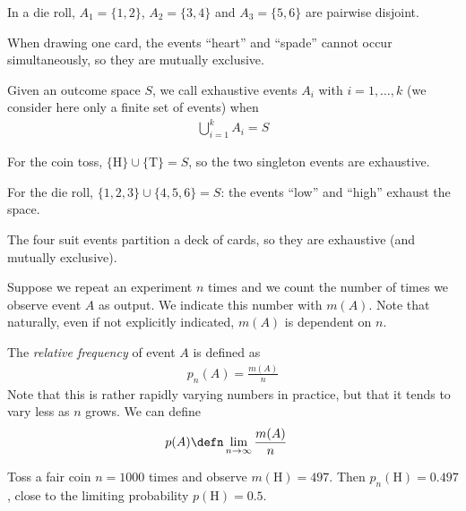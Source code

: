 \documentclass[a4paper, 12pt]{book}
\begin{document}
\begin{example}
    In a die roll, $A_1=\{1,2\}$, $A_2=\{3,4\}$ and $A_3=\{5,6\}$ are pairwise disjoint.
\end{example}

\begin{example}
    When drawing one card, the events ``heart'' and ``spade'' cannot occur simultaneously, so they are mutually exclusive.
\end{example}

\begin{definition}
    Given an outcome space $S$, we call exhaustive
events $A_i$ with $i= 1,\ldots,k$ (we consider here only a finite set of events) when
\begin{align}
    \bigcup_{i=1}^k A_i = S
\end{align}
\end{definition}
\begin{example}
    For the coin toss, $\{\mathrm{H}\}\cup\{\mathrm{T}\}=S$, so the two singleton events are exhaustive.
\end{example}

\begin{example}
    For the die roll, $\{1,2,3\}\cup\{4,5,6\}=S$: the events ``low'' and ``high'' exhaust the space.
\end{example}

\begin{example}
    The four suit events partition a deck of cards, so they are exhaustive (and mutually exclusive).
\end{example}

Suppose we repeat an experiment $n$ times and we count the number of times we observe event $A$ as output. We indicate this number with $m(A)$. Note that naturally, even if not explicitly indicated, $m(A)$ is dependent on $n$.

\begin{definition}
    The \emph{relative frequency} of event $A$ is defined as
    \begin{align}
        p_n(A) = \frac{m(A)}{n}
    \end{align}
    Note that this is rather rapidly varying numbers in practice, but that it tends to vary less as $n$ grows. We can define
    \begin{align}
         p(A) &\defn \lim_{n \rightarrow \infty} \frac{m(A)}{n}
     \end{align}
\end{definition}
\begin{example}
    Toss a fair coin $n=1000$ times and observe $m(\mathrm{H})=497$. Then $p_n(\mathrm{H})=0.497$, close to the limiting probability $p(\mathrm{H})=0.5$.
\end{example}
\end{document}
